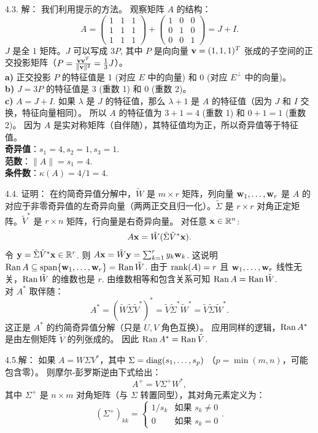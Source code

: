 \begin{exer}
4.3. 解：
我们利用提示的方法。
观察矩阵 $A$ 的结构：
$$ A = \begin{pmatrix} 1 & 1 & 1 \\ 1 & 1 & 1 \\ 1 & 1 & 1 \end{pmatrix} + \begin{pmatrix} 1 & 0 & 0 \\ 0 & 1 & 0 \\ 0 & 0 & 1 \end{pmatrix} = J + I. $$
$J$ 是全 1 矩阵。$J$ 可以写成 $3 P$, 其中 $P$ 是向向量 $\mathbf{v} = (1, 1, 1)^T$ 张成的子空间的正交投影矩阵（$P = \frac{\mathbf{v} \mathbf{v}^T}{\|\mathbf{v}\|^2} = \frac{1}{3} J$）。\\
\textbf{a)} 正交投影 $P$ 的特征值是 1 (对应 $E$ 中的向量) 和 0 (对应 $E^\perp$ 中的向量)。\\
\textbf{b)} $J = 3P$ 的特征值是 3 (重数 1) 和 0 (重数 2)。\\
\textbf{c)} $A = J + I$. 如果 $\lambda$ 是 $J$ 的特征值，那么 $\lambda + 1$ 是 $A$ 的特征值（因为 $J$ 和 $I$ 交换，特征向量相同）。
所以 $A$ 的特征值为 $3+1=4$ (重数 1) 和 $0+1=1$ (重数 2)。
因为 $A$ 是实对称矩阵（自伴随），其特征值均为正，所以奇异值等于特征值。\\
\textbf{奇异值}：$s_1 = 4, s_2 = 1, s_3 = 1$.\\
\textbf{范数}：$\|A\| = s_1 = 4$.\\
\textbf{条件数}：$\kappa(A) = 4/1 = 4$.

4.4. 证明：
在约简奇异值分解中，$\tilde{W}$ 是 $m \times r$ 矩阵，列向量 $\mathbf{w}_1, \dots, \mathbf{w}_r$ 是 $A$ 的对应于非零奇异值的左奇异向量（两两正交且归一化）。$\tilde{\Sigma}$ 是 $r \times r$ 对角正定矩阵。$\tilde{V}^*$ 是 $r \times n$ 矩阵，行向量是右奇异向量。
对任意 $\mathbf{x} \in \mathbb{R}^n$:
$$ A\mathbf{x} = \tilde{W} (\tilde{\Sigma} \tilde{V}^* \mathbf{x}). $$
令 $\mathbf{y} = \tilde{\Sigma} \tilde{V}^* \mathbf{x} \in \mathbb{R}^r$. 则 $A\mathbf{x} = \tilde{W} \mathbf{y} = \sum_{k=1}^r y_k \mathbf{w}_k$.
这说明 $\operatorname{Ran} A \subseteq \operatorname{span}\{\mathbf{w}_1, \dots, \mathbf{w}_r\} = \operatorname{Ran} \tilde{W}$.
由于 $\operatorname{rank}(A) = r$ 且 $\mathbf{w}_1, \dots, \mathbf{w}_r$ 线性无关，$\operatorname{Ran} \tilde{W}$ 的维数也是 $r$.
由维数相等和包含关系可知 $\operatorname{Ran} A = \operatorname{Ran} \tilde{W}$.
\\
对 $A^*$ 取伴随：
$$ A^* = (\tilde{W} \tilde{\Sigma} \tilde{V}^*)^* = \tilde{V} \tilde{\Sigma}^* \tilde{W}^* = \tilde{V} \tilde{\Sigma} \tilde{W}^*. $$
这正是 $A^*$ 的约简奇异值分解（只是 $U, V$ 角色互换）。
应用同样的逻辑，$\operatorname{Ran} A^*$ 是由左侧矩阵 $\tilde{V}$ 的列张成的。
因此 $\operatorname{Ran} A^* = \operatorname{Ran} \tilde{V}$.

4.5.解：
如果 $A = W \Sigma V^*$，其中 $\Sigma = \operatorname{diag}(s_1, \dots, s_p)$ （$p = \min(m,n)$，可能包含零）。
则摩尔-彭罗斯逆由下式给出：
$$ A^+ = V \Sigma^+ W^*, $$
其中 $\Sigma^+$ 是 $n \times m$ 对角矩阵（与 $\Sigma$ 转置同型），其对角元素定义为：
$$ (\Sigma^+)_{kk} = \begin{cases} 1/s_k & \text{如果 } s_k \neq 0 \\ 0 & \text{如果 } s_k = 0 \end{cases}. $$


\end{exer}
